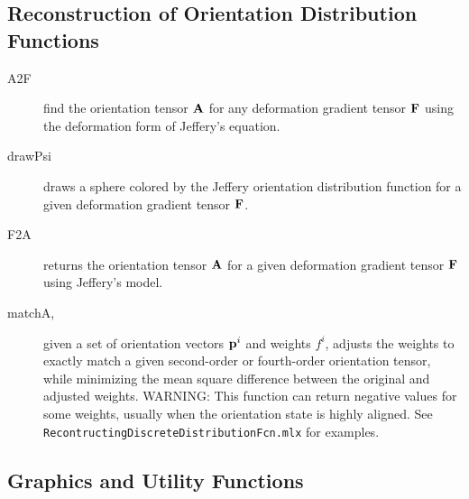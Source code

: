 \documentclass[11pt]{article}
\begin{document}
\subsection{Reconstruction of Orientation Distribution Functions}

\begin{description}

    \item[A2F]{find the orientation tensor $\mathbf{A}$ for any deformation gradient tensor $\mathbf{F}$ using the deformation form of Jeffery's equation.}
    
    \item[drawPsi]{draws a sphere colored by the Jeffery orientation distribution function for a given deformation gradient tensor $\mathbf{F}$.}
    
    \item[F2A]{returns the orientation tensor $\mathbf{A}$ for a given deformation gradient tensor $\mathbf{F}$ using Jeffery's model.}
    
    \item[matchA,]{given a set of orientation vectors $\mathbf{p}^i$ and weights $f^i$, adjusts the weights to exactly match a given second-order or fourth-order orientation tensor, while minimizing the mean square difference between the original and adjusted weights.  WARNING: This function can return negative values for some weights, usually when the orientation state is highly aligned.  See \texttt{RecontructingDiscreteDistributionFcn.mlx} for examples.}    
    
\end{description}

\subsection{Graphics and Utility Functions}
\end{document}
